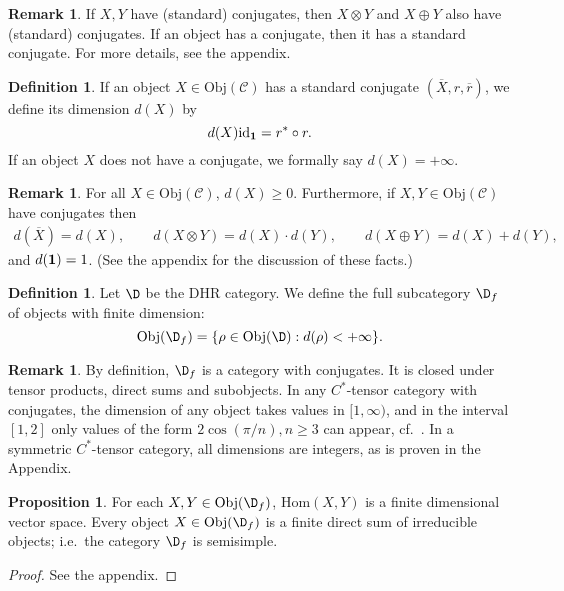 \documentclass[12pt]{article}
\theoremstyle{definition}
\newtheorem{prop}[thm]{Proposition}
\theoremstyle{definition}
\newtheorem{defn}[thm]{Definition}
\newtheorem{note}[thm]{Remark}
\theoremstyle{remark}
\newcommand{\Obj}{\mathrm{Obj}}
\def\2#1{{\mathcal #1}}
\def\1#1{{\bf #1}}
\def\ol#1{{\overline #1}}
\newcommand{\Hom}{\mathrm{Hom}}
\def\id{\mathrm{id}}
\begin{document}
\begin{note} If $X,Y$ have (standard) conjugates, then
  $X\otimes Y$ and $X\oplus Y$ also have (standard)
  conjugates.  If an object has a conjugate, then it
  has a standard conjugate.  For more details, see the
  appendix.
\end{note}

\begin{defn} If an object $X\in \Obj (\2C )$ has a standard conjugate $(\ol X,r,\ol r
  )$, we define its dimension $d(X)$ by
$$d(X)\id _{\11}=r^*\circ r . $$  
If an object $X$ does not have a conjugate, we formally say $d(X)=+\infty$.  \end{defn}

\begin{note} For all $X\in \Obj (\2C )$, $d(X)\geq 0$.
  Furthermore, if $X ,Y\in \Obj (\2C )$ have conjugates
  then
\begin{eqnarray*}
  d(\ol X)=d(X) ,\qquad d(X\otimes Y)=d(X)\cdot d(Y),\qquad d(X\oplus Y)=d(X)+d(Y)
  ,\end{eqnarray*}
and $d(\11 )=1$.  (See the appendix for the discussion of these facts.)  \end{note}

\begin{defn} Let $\D$ be the DHR category.  We define
  the full subcategory $\D _f$ of objects with finite
  dimension:
$$ \Obj (\D _f)=\{ \rho \in \Obj (\D ):d(\rho )<+\infty \} .$$ 
\end{defn}

\begin{note} 
By definition, $\D_f$ is a category with conjugates. It is closed under tensor products, direct sums
and subobjects. In any $C^*$-tensor category with conjugates, the dimension of any object takes
values in $[1,\infty)$, and in the interval $[1,2]$ only values of the form $2\cos(\pi/n), n\ge 3$
can appear, cf.\ \cite{LR}. In a symmetric $C^*$-tensor category, all dimensions are integers, as is
proven in the Appendix.
\end{note}

\begin{prop} \label{prop-fd} For each $X,Y\in \Obj (\D
  _f)$, $\Hom (X,Y)$ is a finite dimensional vector
  space.  Every object $X\in \Obj (\D _f)$ is a finite
  direct sum of irreducible objects; i.e.\ the category
  $\D _f$ is semisimple.  \label{semisimple}
\end{prop}

\begin{proof} See the appendix.  \end{proof}
\end{document}
